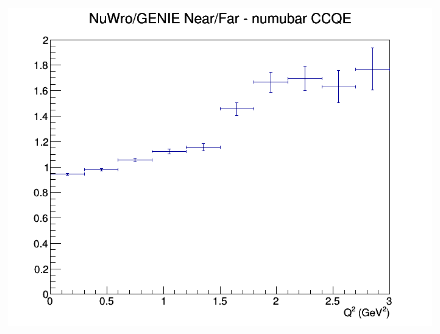 \begin{figure}[h]
\endminipage
{}
\includegraphics[width=\linewidth]{Q2/nominal/ratios/CCQE_NuWro_GENIE_numubar_NF_Q2.png}
\endminipage
\newline
\end{figure}
\clearpage
